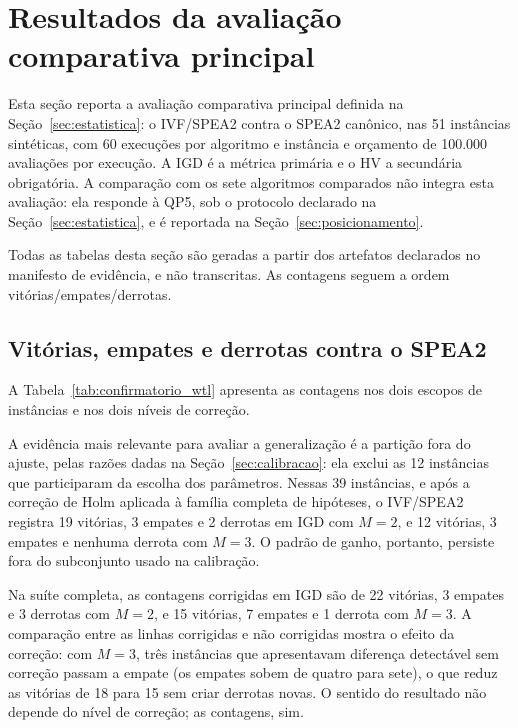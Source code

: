 \section{Resultados da avaliação comparativa principal}
\label{sec:results}

Esta seção reporta a avaliação comparativa principal definida na Seção~\ref{sec:estatistica}: o IVF/SPEA2 contra o SPEA2 canônico, nas 51 instâncias sintéticas, com 60 execuções por algoritmo e instância e orçamento de 100.000 avaliações por execução. A IGD é a métrica primária e o HV a secundária obrigatória. A comparação com os sete algoritmos comparados não integra esta avaliação: ela responde à QP5, sob o protocolo declarado na Seção~\ref{sec:estatistica}, e é reportada na Seção~\ref{sec:posicionamento}.

Todas as tabelas desta seção são geradas a partir dos artefatos declarados no manifesto de evidência, e não transcritas. As contagens seguem a ordem vitórias/empates/derrotas.

\subsection{Vitórias, empates e derrotas contra o SPEA2}
\label{sec:confirmatorio}

A Tabela~\ref{tab:confirmatorio_wtl} apresenta as contagens nos dois escopos de instâncias e nos dois níveis de correção.



A evidência mais relevante para avaliar a generalização é a partição fora do ajuste, pelas razões dadas na Seção~\ref{sec:calibracao}: ela exclui as 12 instâncias que participaram da escolha dos parâmetros. Nessas 39 instâncias, e após a correção de Holm aplicada à família completa de hipóteses, o IVF/SPEA2 registra 19 vitórias, 3 empates e 2 derrotas em IGD com $M = 2$, e 12 vitórias, 3 empates e nenhuma derrota com $M = 3$. O padrão de ganho, portanto, persiste fora do subconjunto usado na calibração.

Na suíte completa, as contagens corrigidas em IGD são de 22 vitórias, 3 empates e 3 derrotas com $M = 2$, e 15 vitórias, 7 empates e 1 derrota com $M = 3$. A comparação entre as linhas corrigidas e não corrigidas mostra o efeito da correção: com $M = 3$, três instâncias que apresentavam diferença detectável sem correção passam a empate (os empates sobem de quatro para sete), o que reduz as vitórias de 18 para 15 sem criar derrotas novas. O sentido do resultado não depende do nível de correção; as contagens, sim.

